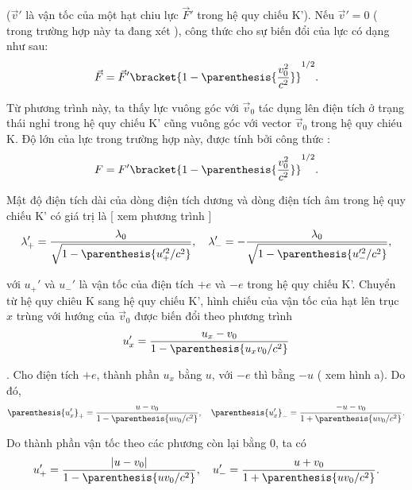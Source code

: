 \noindent
($\vec{v}'$ là vận tốc của một hạt chiu lực $\vec{F}'$ trong hệ quy chiếu K'). Nếu $\vec{v}'=0$ ( trong trường hợp này ta đang xét ), công thức cho sự biến đổi của lực có dạng như sau:
\begin{equation*}
    \vec{F} = \vec{F}' \bracket{1 - \parenthesis{ \frac{v_0^2}{c^2} }}^{1/2}.
\end{equation*}

Từ phương trình này, ta thấy lực vuông góc với $\vec{v}_0$ tác dụng lên điện tích ở trạng thái nghỉ trong hệ quy chiếu K' cũng vuông góc với vector $\vec{v}_0$ trong hệ quy chiéu K. Độ lớn của lực trong trường hợp này, được tính bởi công thức :
\begin{equation}\label{eq:6_52}
    F = F' \bracket{1 - \parenthesis{ \frac{v_0^2}{c^2} }}^{1/2}.
\end{equation}

Mật độ điện tích dài của dòng điện tích dương và dòng điện tích âm trong hệ quy chiếu K' có giá trị là [ xem phương trình  ]
\begin{equation}\label{eq:6_53}
    \lambda_+' = \frac{\lambda_0}{\sqrt{1 - \parenthesis{u_+'^2/c^2}}},\quad \lambda_-' = - \frac{\lambda_0}{\sqrt{1 - \parenthesis{u_-'^2/c^2}}},
\end{equation}

\noindent
với $u_+'$ và $u_-'$ là vận tốc của điện tích $+e$ và $-e$ trong hệ quy chiếu K'. Chuyển từ hệ quy chiêu K sang hệ quy chiếu K', hình chiếu của vận tốc của hạt lên trục $x$ trùng với hướng của $\vec{v}_0$ được biến đổi theo phương trình
\begin{equation*}
    u_x' = \frac{u_x - v_0}{1 - \parenthesis{u_xv_0/c^2}}
\end{equation*}

. Cho điện tích $+e$, thành phần $u_x$ bằng $u$, với $-e$ thì bằng $-u$ ( xem hình a). Do đó,
\begin{equation*}
    \parenthesis{u_x'}_+ = \frac{u - v_0}{1 - \parenthesis{uv_0/c^2}},\quad \parenthesis{u_x'}_- = \frac{-u - v_0}{1 + \parenthesis{uv_0/c^2}}.
\end{equation*}

\noindent
Do thành phần vận tốc theo các phương còn lại bằng 0, ta có
\begin{equation}\label{eq:6_54}
    u_+' = \frac{|u - v_0|}{1 - \parenthesis{uv_0/c^2}},\quad u_-' = \frac{u + v_0}{1 + \parenthesis{uv_0/c^2}}.
\end{equation}

